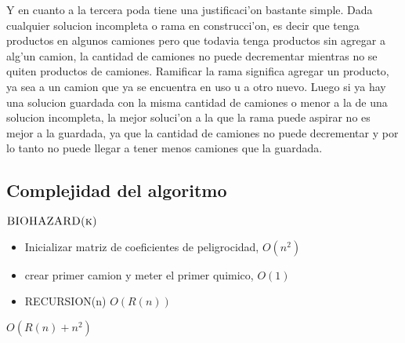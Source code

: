 Y en cuanto a la tercera poda tiene una justificaci'on bastante simple. Dada cualquier solucion incompleta o rama en construcci'on, es decir que tenga productos en algunos camiones pero que todavia tenga productos sin agregar a alg'un camion, la cantidad de camiones no puede decrementar mientras no se quiten productos de camiones. Ramificar la rama significa agregar un producto, ya sea a un camion que ya se encuentra en uso u a otro nuevo. Luego si ya hay una solucion guardada con la misma cantidad de camiones o menor a la de una solucion incompleta, la mejor soluci'on a la que la rama puede aspirar no es mejor a la guardada, ya que la cantidad de camiones no puede decrementar y por lo tanto no puede llegar a tener menos camiones que la guardada.


\subsection{Complejidad del algoritmo}




$\textnormal{\scshape BIOHAZARD(k)}$

\begin{itemize}
	\item Inicializar matriz de coeficientes de peligrocidad,		$O(n^2)$
	\item crear primer camion y meter el primer quimico,		$O(1)$
	\item RECURSION(n)										$O(R(n))$
\end{itemize}		$O(R(n) + n^2 )$ \\


\\



